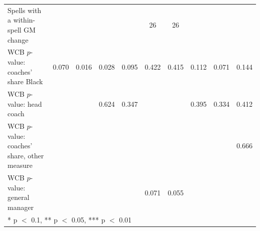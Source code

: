 \begin{table}[H]
{\begin{tabular}[t]{lccccccccc}
Spells with a within-spell GM change &  &  &  &  & 26 & 26 &  &  & \\
WCB $p$-value: coaches' share Black & 0.070 & 0.016 & 0.028 & 0.095 & 0.422 & 0.415 & 0.112 & 0.071 & 0.144\\
WCB $p$-value: head coach &  &  & 0.624 & 0.347 &  &  & 0.395 & 0.334 & 0.412\\
WCB $p$-value: coaches' share, other measure &  &  &  &  &  &  &  &  & 0.666\\
WCB $p$-value: general manager &  &  &  &  & 0.071 & 0.055 &  &  & \\
\bottomrule
\multicolumn{10}{l}{\rule{0pt}{1em}* p $<$ 0.1, ** p $<$ 0.05, *** p $<$ 0.01}\\
\end{tabular}}
\end{table}

